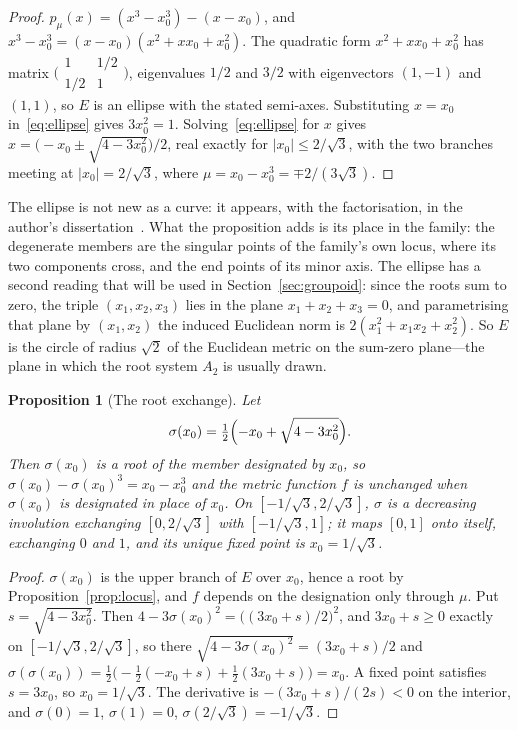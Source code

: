 \documentclass[11pt]{article}
\theoremstyle{plain}
\newtheorem{proposition}[theorem]{Proposition}
\theoremstyle{definition}
\theoremstyle{remark}
\begin{document}
\begin{proof}
$p_{\mu}(x)=(x^{3}-x_{0}^{3})-(x-x_{0})$, and $x^{3}-x_{0}^{3}=(x-x_{0})(x^{2}+xx_{0}+x_{0}^{2})$. The quadratic form
$x^{2}+xx_{0}+x_{0}^{2}$ has matrix $\bigl(\begin{smallmatrix}1&1/2\\1/2&1\end{smallmatrix}\bigr)$, eigenvalues
$1/2$ and $3/2$ with eigenvectors $(1,-1)$ and $(1,1)$, so $E$ is an ellipse with the stated semi-axes.
Substituting $x=x_{0}$ in~\eqref{eq:ellipse} gives $3x_{0}^{2}=1$. Solving~\eqref{eq:ellipse} for $x$ gives
$x=\bigl(-x_{0}\pm\sqrt{4-3x_{0}^{2}}\bigr)/2$, real exactly for $|x_{0}|\le2/\sqrt3$, with the two branches meeting
at $|x_{0}|=2/\sqrt3$, where $\mu=x_{0}-x_{0}^{3}=\mp2/(3\sqrt3)$.
\end{proof}

The ellipse is not new as a curve: it appears, with the factorisation, in the author's dissertation~\cite{JanzenThesis}.
What the proposition adds is its place in the family: the degenerate members are the singular points of the
family's own locus, where its two components cross, and the end points of its minor axis. The ellipse has a
second reading that will be used in Section~\ref{sec:groupoid}: since the roots sum to zero, the triple
$(x_{1},x_{2},x_{3})$ lies in the plane $x_{1}+x_{2}+x_{3}=0$, and parametrising that plane by $(x_{1},x_{2})$ the
induced Euclidean norm is $2(x_{1}^{2}+x_{1}x_{2}+x_{2}^{2})$. So $E$ is the circle of radius $\sqrt2$ of the
Euclidean metric on the sum-zero plane---the plane in which the root system $A_{2}$ is usually drawn.

\begin{proposition}[The root exchange]\label{prop:sigma}
Let
\begin{equation}\label{eq:sigma}
\sigma(x_{0})=\tfrac12\Bigl(-x_{0}+\sqrt{4-3x_{0}^{2}}\Bigr).
\end{equation}
Then $\sigma(x_{0})$ is a root of the member designated by $x_{0}$, so $\sigma(x_{0})-\sigma(x_{0})^{3}=x_{0}-x_{0}^{3}$
and the metric function $f$ is unchanged when $\sigma(x_{0})$ is designated in place of $x_{0}$. On
$[-1/\sqrt3,2/\sqrt3]$, $\sigma$ is a decreasing involution exchanging $[0,2/\sqrt3]$ with $[-1/\sqrt3,1]$;
it maps $[0,1]$ onto itself, exchanging $0$ and $1$, and its unique fixed point is $x_{0}=1/\sqrt3$.
\end{proposition}

\begin{proof}
$\sigma(x_{0})$ is the upper branch of $E$ over $x_{0}$, hence a root by Proposition~\ref{prop:locus}, and $f$
depends on the designation only through $\mu$. Put $s=\sqrt{4-3x_{0}^{2}}$. Then
$4-3\sigma(x_{0})^{2}=\bigl((3x_{0}+s)/2\bigr)^{2}$, and $3x_{0}+s\ge0$ exactly on $[-1/\sqrt3,2/\sqrt3]$, so there
$\sqrt{4-3\sigma(x_{0})^{2}}=(3x_{0}+s)/2$ and $\sigma(\sigma(x_{0}))=\tfrac12\bigl(-\tfrac12(-x_{0}+s)+\tfrac12(3x_{0}+s)\bigr)
=x_{0}$. A fixed point satisfies $s=3x_{0}$, so $x_{0}=1/\sqrt3$. The derivative is $-(3x_{0}+s)/(2s)<0$ on the
interior, and $\sigma(0)=1$, $\sigma(1)=0$, $\sigma(2/\sqrt3)=-1/\sqrt3$.
\end{proof}
\end{document}
